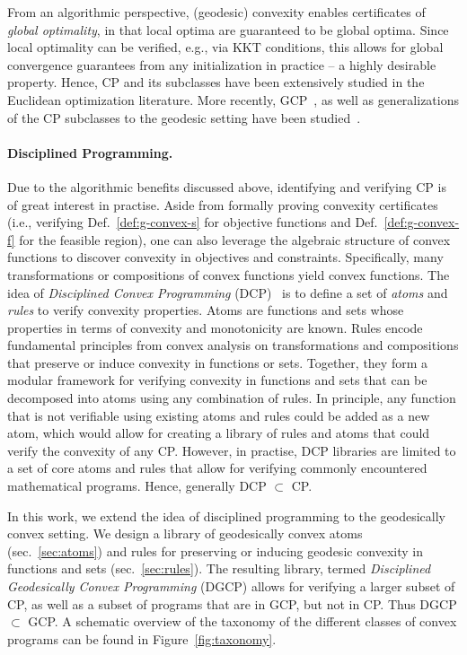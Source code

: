 \documentclass[twoside,11pt]{article}
\begin{document}
From an algorithmic perspective, (geodesic) convexity enables certificates of \emph{global optimality}, in that local optima are guaranteed to be global optima. Since local optimality can be verified, e.g., via KKT conditions, this allows for  global convergence guarantees from any initialization in practice -- a highly desirable property. 
Hence, CP and its subclasses have been extensively studied in the Euclidean optimization literature. More recently, GCP~\citep{udriste1994convex,bacak2014convex,boumal2020introduction,absil_interpolation}, as well as generalizations of the CP subclasses to the geodesic setting have been studied~\citep{sra2015conic}.

\paragraph{Disciplined Programming.}
Due to the algorithmic benefits discussed above, identifying and verifying CP is of great interest in practise. Aside from formally proving convexity certificates (i.e., verifying Def.~\ref{def:g-convex-s} for objective functions and Def.~\ref{def:g-convex-f} for the feasible region), one can also leverage the algebraic structure of convex functions to discover convexity in objectives and constraints. Specifically, many transformations or compositions of convex functions yield convex functions. The idea of \emph{Disciplined Convex Programming} (DCP)~\citep{grant2006disciplined} is to define a set of \emph{atoms} and \emph{rules} to verify convexity properties. Atoms are functions and sets whose properties in terms of convexity and monotonicity are known. Rules encode fundamental principles from convex analysis on transformations and compositions that preserve or induce convexity in functions or sets. Together, they form a modular framework for verifying convexity in functions and sets that can be decomposed into atoms using any combination of rules. In principle, any function that is not verifiable using existing atoms and rules could be added as a new atom, which would allow for creating a library of rules and atoms that could verify the convexity of any CP. However, in practise, DCP libraries are limited to a set of core atoms and rules that allow for verifying commonly encountered mathematical programs. Hence, generally DCP $\subset$ CP.

In this work, we extend the idea of disciplined programming to the geodesically convex setting. We design a library of geodesically convex atoms (sec.~\ref{sec:atoms}) and rules for preserving or inducing geodesic convexity in functions and sets (sec.~\ref{sec:rules}). The resulting library, termed \emph{Disciplined Geodesically Convex Programming} (DGCP) allows for verifying a larger subset of CP, as well as a subset of programs that are in GCP, but not in CP. Thus DGCP $\subset$ GCP. A schematic overview of the taxonomy of the different classes of convex programs can be found in Figure~\ref{fig:taxonomy}.
\end{document}

